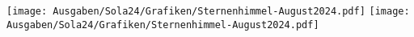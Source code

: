 
\texttt{[image: Ausgaben/Sola24/Grafiken/Sternenhimmel-August2024.pdf]}
\newpage
\texttt{[image: Ausgaben/Sola24/Grafiken/Sternenhimmel-August2024.pdf]}